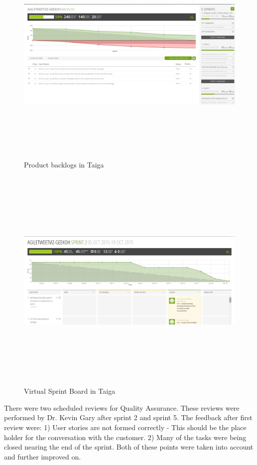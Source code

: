 \documentclass[11pt]{article}
\begin{document}
\begin{figure}[!ht]
\centering
\includegraphics[height=11cm]{Backlog.png}
\caption{Product backlogs in Taiga\cite{TaigaSite}}
\end{figure}

\begin{figure}[!ht]
\centering
\includegraphics[height=11cm]{SprintBoard.jpg}
\caption{Virtual Sprint Board in Taiga\cite{TaigaSite}}
\end{figure}

There were two scheduled reviews for Quality Assurance. These reviews were performed by Dr. Kevin Gary after sprint 2 and sprint 5. The feedback after first review were: 1) User stories are not formed correctly - This should be the place holder for the conversation with the customer. 2) Many of the tasks were being closed nearing the end of the sprint. Both of these points were taken into account and further improved on. 
\end{document}
